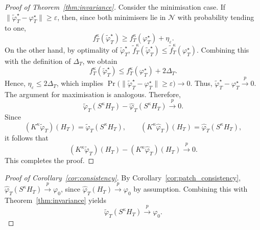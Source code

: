 \documentclass[12pt]{article}
\numberwithin{equation}{section}
\begin{document}
\begin{proof}[Proof of Theorem~\ref{thm:invariance}]
Consider the minimisation case. If
$\|\tilde{\varphi}_T^\star-\varphi_T^\star\|\ge\varepsilon$,
then, since both minimisers lie in $\mathcal N$ with probability tending to one,
\begin{equation}
f_T^\kappa(\tilde{\varphi}_T^\star)
\ge
f_T^\kappa(\varphi_T^\star)+\eta_\varepsilon.
\end{equation}
On the other hand, by optimality of $\tilde{\varphi}_T^\star$,
$\tilde f_T^\kappa(\tilde{\varphi}_T^\star)
\le
\tilde f_T^\kappa(\varphi_T^\star)$.
Combining this with the definition of $\Delta_T$, we obtain
\begin{equation}
f_T^\kappa(\tilde{\varphi}_T^\star)
\le
f_T^\kappa(\varphi_T^\star)+2\Delta_T.
\end{equation}
Hence,
$\eta_\varepsilon \le 2\Delta_T$,
which implies
$\Pr\bigl(\|\tilde{\varphi}_T^\star-\varphi_T^\star\|\ge\varepsilon\bigr)\longrightarrow 0$.
Thus,
$\tilde{\varphi}_T^\star-\varphi_T^\star\overset{p}{\longrightarrow}0$.
The argument for maximisation is analogous. Therefore,
\begin{equation}
\tilde{\varphi}_T(S^\kappa H_T)-\hat{\varphi}_T(S^\kappa H_T)\overset{p}{\longrightarrow}0.
\end{equation}
Since
\begin{equation}
(K^\kappa \tilde{\varphi}_T)(H_T)=\tilde{\varphi}_T(S^\kappa H_T),
\qquad
(K^\kappa \hat{\varphi}_T)(H_T)=\hat{\varphi}_T(S^\kappa H_T),
\end{equation}
it follows that
\begin{equation}
(K^\kappa \tilde{\varphi}_T)(H_T)-(K^\kappa \hat{\varphi}_T)(H_T)
\overset{p}{\longrightarrow}0.
\end{equation}
This completes the proof.
\end{proof}




\begin{proof}[Proof of Corollary~\ref{cor:consistency}]
By Corollary~\ref{cor:patch_consistency},
$\hat{\varphi}_T(S^\kappa H_T)\overset{p}{\longrightarrow}\varphi_0$,
since $\hat{\varphi}_T(H_T)\overset{p}{\longrightarrow}\varphi_0$ by assumption.
Combining this with Theorem~\ref{thm:invariance} yields
\begin{equation}
\tilde{\varphi}_T(S^\kappa H_T)\overset{p}{\longrightarrow}\varphi_0.
\end{equation}
\end{proof}
\end{document}
